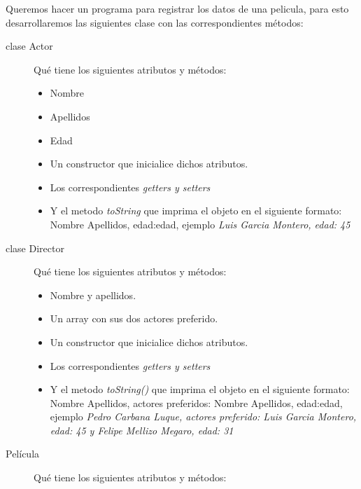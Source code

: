 \documentclass[addpoints,12pt]{exam}
\begin{document}
\begin{center}
\end{center}
\vspace{0.1in}
\begin{questions}
\question Queremos hacer un programa para registrar los datos de una pelicula, para esto desarrollaremos las siguientes clase con las correspondientes métodos:
\begin{description}
\item[clase Actor] Qué tiene los siguientes atributos y métodos:
\begin{itemize}
\item Nombre
\item Apellidos
\item Edad
\item Un constructor que inicialice dichos atributos.
\item Los correspondientes \emph{getters y setters}
\item Y el metodo \emph{toString} que imprima el objeto en el siguiente formato: Nombre Apellidos, edad:edad, ejemplo \emph{Luis Garcia Montero, edad: 45}
\end{itemize}
\item[clase Director] Qué tiene los siguientes atributos y métodos:
\begin{itemize}
\item Nombre y apellidos.
\item Un array con sus dos actores preferido. 
\item Un constructor que inicialice dichos atributos.
\item Los correspondientes \emph{getters y setters}
\item Y el metodo \emph{toString()} que imprima el objeto en el siguiente formato: Nombre Apellidos, actores preferidos: Nombre Apellidos, edad:edad, ejemplo \emph{Pedro Carbana Luque, actores preferido: Luis Garcia Montero, edad: 45 y Felipe Mellizo Megaro, edad: 31}
\end{itemize}
\item[Película] Qué tiene los siguientes atributos y métodos:

\end{description}
\end{questions}
\end{document}
